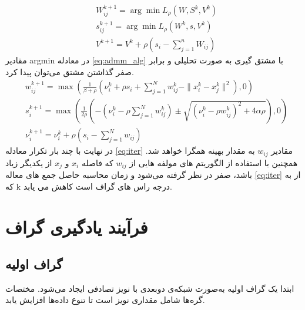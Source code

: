 \documentclass[10pt,twocolumn,a4paper]{article}
\begin{document}
	\begin{equation}\label{eq:admm_alg}
		\begin{aligned}
		&W_{ij}^{k+1} = \arg\min L_{\rho} (W, S^k, V^k)\\
		&s_{ij}^{k+1} = \arg\min L_{\rho} (W^k, s, V^k)\\
		&V^{k+1} = V^k + \rho \left( s_i - \sum_{j=1}^{n} W_{ij} \right)
	\end{aligned}
	\end{equation}
	 مقادیر argmin در معادله \ref{eq:admm_alg} با مشتق گیری به صورت تحلیلی و برابر صفر گذاشتن مشتق می‌توان پیدا کرد.
	 \begin{equation}\label{eq:iter}
	 	\begin{aligned}
	 	&w_{ij}^{k+1} = \max \left( \frac{1}{\beta + \rho} \left( \nu_i^k + \rho s_i + \sum_{j=1}^{N} w_{ij}^k - \|x_i^k - x_j^k\|^2 \right), 0 \right) \\
	 	&s_i^{k+1} = \max \left( \frac{1}{2\rho} \left( -\left( \nu_i^k - \rho \sum_{j=1}^{N} w_{ij}^k \right) \pm \sqrt{\left( \nu_i^k - \rho w_{ij}^k \right)^2 + 4\alpha \rho} \right), 0 \right) \\
	 	&\nu_i^{k+1} = \nu_i^k + \rho \left( s_i - \sum_{j=1}^{N} w_{ij} \right)
	 	\end{aligned}
	 \end{equation}
	 	در نهایت با چند بار تکرار معادله \ref{eq:iter} مقادیر $w_{ij}$ به مقدار بهینه همگرا خواهد شد. همچنین با استفاده از الگوریتم های
	 	  مولفه هایی از $w_{ij}$ که فاصله $x_i$ و $x_j$ از یکدیگر زیاد باشد، صفر در نظر گرفته می‌شود و زمان محاسبه حاصل جمع های معاله \ref{eq:iter} از
	 	    به
	 	     که k درجه راس های گراف است کاهش می یابد.






  

\nocite{*}



	\appendix
	
	\section{فرآیند یادگیری گراف}
	
	\subsection{گراف اولیه}
	ابتدا یک گراف اولیه به‌صورت شبکه‌ی دوبعدی با نویز تصادفی ایجاد می‌شود. مختصات گره‌ها شامل مقداری نویز است تا تنوع داده‌ها افزایش یابد.
	
\end{document}
